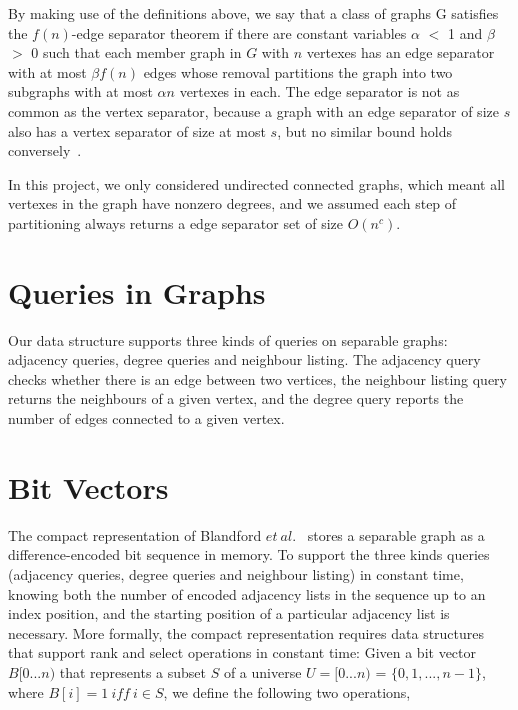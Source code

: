 \documentclass[12pt,glossary]{dalthesis}
\begin{document}
\bigskip
\bigskip

By making use of the definitions above, we say that a class of graphs G satisfies the $f(n)$-edge separator theorem if there are constant variables $\alpha$ $<$ 1 and $\beta$ $>$ 0 such that each member graph in $G$ with $n$ vertexes has an edge separator with at most $\beta f(n)$ edges whose removal partitions the graph into two subgraphs with at most $\alpha n$ vertexes in each. The edge separator is not as common as the vertex separator, because a graph with an edge separator of size $s$ also has a vertex separator of size at most $s$, but no similar bound holds conversely~\cite{compact-representation}.

\bigskip
\bigskip

In this project, we only considered undirected connected graphs, which meant all vertexes in the graph have nonzero degrees, and we assumed each step of partitioning always returns a edge separator set of size $O(n^{c})$.

\bigskip
\bigskip

\section{Queries in Graphs}
Our data structure supports three kinds of queries on separable graphs: adjacency queries, degree queries and neighbour listing. The adjacency query checks whether there is an edge between two vertices, the neighbour listing query returns the neighbours of a given vertex, and the degree query reports the number of edges connected to a given vertex.

\bigskip
\bigskip

\section{Bit Vectors}
The compact representation of Blandford $et \ al.$~\cite{compact-representation} stores a separable graph as a difference-encoded bit sequence in memory. To support the three kinds queries (adjacency queries, degree queries and neighbour listing) in constant time, knowing both the number of encoded adjacency lists in the sequence up to an index position, and the starting position of a particular adjacency list is necessary. More formally, the compact representation requires data structures that support rank and select operations in constant time: Given a bit vector $B[0...n)$ that represents a subset $S$ of a universe $U = [0...n)$ = $\{0,1,...,n-1 \}$, where $B[i] = 1 \ iff \ i \in S$, we define the following two operations, 
\end{document}
